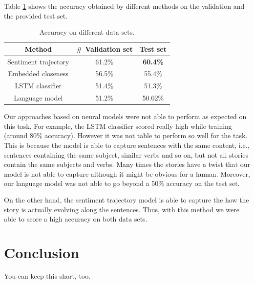\documentclass{article}
\newcommand{\lstm}{LSTM }
\begin{document}
Table \ref{tab:results} shows the accuracy obtained by different methods on the
validation and the provided test set. 

\begin{table}
    \caption{Accuracy on different data sets.}
    \begin{center}
        \label{tab:results}
        \begin{tabular}{||c c c||} 
            \hline
            Method                 & \# Validation set         & Test set \\ [0.5ex] 
            \hline\hline
            Sentiment trajectory   & 61.2\%                    & \textbf{60.4\%} \\ 
            \hline
            Embedded closeness     & 56.5\%                    & 55.4\% \\
            \hline
            LSTM classifier        & 51.4\%                    & 51.3\% \\ 
            \hline
            Language model         & 51.2\%                    & 50.02\% \\ [1ex] 
            \hline
        \end{tabular}
    \end{center}
\end{table}

Our approaches based on neural models were not able to perform as expected on
this task. For example, the \lstm classifier scored really high while training
(around 80\% accuracy). However it was not table to perform so well for the
task. This is because the model is able to capture sentences with the same
content, i.e., sentences containing the same subject, similar verbs and so on,
but not all stories contain the same subjects and verbs. Many times the stories
have a twist that our model is not able to capture although it might be obvious
for a human. Moreover, our language model was not able to go beyond a 50\%
accuracy on the test set. 

On the other hand, the sentiment trajectory model is able to capture the how the
story is actually evolving along the sentences. Thus, with this method we were
able to score a high accuracy on both data sets.


\section{Conclusion}
You can keep this short, too. \cite{*}



\end{document}
